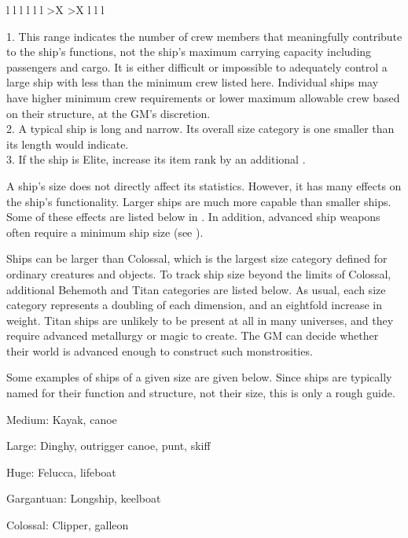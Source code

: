 \begin{dtable*}
\begin{compresseddtabularx}{\textwidth}{l l l l l l >{\lcol}X >{\lcol}X l l l}
    \end{compresseddtabularx}
    1. This range indicates the number of crew members that meaningfully contribute to the ship's functions, not the ship's maximum carrying capacity including passengers and cargo.
    It is either difficult or impossible to adequately control a large ship with less than the minimum crew listed here.
    Individual ships may have higher minimum crew requirements or lower maximum allowable crew based on their structure, at the GM's discretion. \\
    2. A typical ship is long and narrow.
    Its overall size category is one smaller than its length would indicate. \\
    3. If the ship is Elite, increase its item rank by an additional .
  \end{dtable*}

  A ship's size does not directly affect its statistics.
  However, it has many effects on the ship's functionality.
  Larger ships are much more capable than smaller ships.
  Some of these effects are listed below in .
  In addition, advanced ship weapons often require a minimum ship size (see ).

  Ships can be larger than Colossal, which is the largest size category defined for ordinary creatures and objects.
  To track ship size beyond the limits of Colossal, additional Behemoth and Titan categories are listed below.
  As usual, each size category represents a doubling of each dimension, and an eightfold increase in weight.
  Titan ships are unlikely to be present at all in many universes, and they require advanced metallurgy or magic to create.
  The GM can decide whether their world is advanced enough to construct such monstrosities.

  Some examples of ships of a given size are given below.
  Since ships are typically named for their function and structure, not their size, this is only a rough guide.
  \begin{raggeditemize}
    \item Medium: Kayak, canoe
    \item Large: Dinghy, outrigger canoe, punt, skiff
    \item Huge: Felucca, lifeboat
    \item Gargantuan: Longship, keelboat
    \item Colossal: Clipper, galleon
  \end{raggeditemize}

